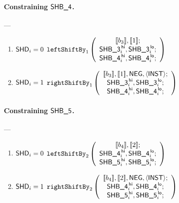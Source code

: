 \paragraph{Constraining $\textsf{SHB\_4}$.} ---
\begin{enumerate}
	\item \If $\textsf{SHD}_{i} = 0$ \Then $\texttt{leftShiftBy}_{1}\left(
	\begin{array}{c}
	[\![b_{3}]\!], [\![1]\!]; \\
	\textsf{SHB\_3}^{\mathsf{\,hi}}_{i}, \textsf{SHB\_3}^{\mathsf{\,lo}}_{i}; \\
	\textsf{SHB\_4}^{\mathsf{\,hi}}_{i}, \textsf{SHB\_4}^{\mathsf{\,lo}}_{i}; \\
	\end{array}\right)$
	\item \If $\textsf{SHD}_{i} = 1$ \Then $\texttt{rightShiftBy}_{1}\left(
	\begin{array}{c}
	[\![b_{3}]\!], [\![1]\!], \textsf{NEG}, \langle{}\textsf{INST}\rangle{}; \\
	\textsf{SHB\_3}^{\mathsf{\,hi}}_{i}, \textsf{SHB\_3}^{\mathsf{\,lo}}_{i}; \\
	\textsf{SHB\_4}^{\mathsf{\,hi}}_{i}, \textsf{SHB\_4}^{\mathsf{\,lo}}_{i}; \\
	\end{array}\right)$
\end{enumerate}

\paragraph{Constraining $\textsf{SHB\_5}$.} ---
\begin{enumerate}
	\item \If $\textsf{SHD}_{i} = 0$ \Then $\texttt{leftShiftBy}_{2}\left(
	\begin{array}{c}
	[\![b_{4}]\!], [\![2]\!]; \\
	\textsf{SHB\_4}^{\mathsf{\,hi}}_{i}, \textsf{SHB\_4}^{\mathsf{\,lo}}_{i}; \\
	\textsf{SHB\_5}^{\mathsf{\,hi}}_{i}, \textsf{SHB\_5}^{\mathsf{\,lo}}_{i}; \\
	\end{array}\right)$
	\item \If $\textsf{SHD}_{i} = 1$ \Then $\texttt{rightShiftBy}_{2}\left(
	\begin{array}{c}
	[\![b_{4}]\!], [\![2]\!], \textsf{NEG}, \langle{}\textsf{INST}\rangle{}; \\
	\textsf{SHB\_4}^{\mathsf{\,hi}}_{i}, \textsf{SHB\_4}^{\mathsf{\,lo}}_{i}; \\
	\textsf{SHB\_5}^{\mathsf{\,hi}}_{i}, \textsf{SHB\_5}^{\mathsf{\,lo}}_{i}; \\
	\end{array}\right)$
\end{enumerate}

